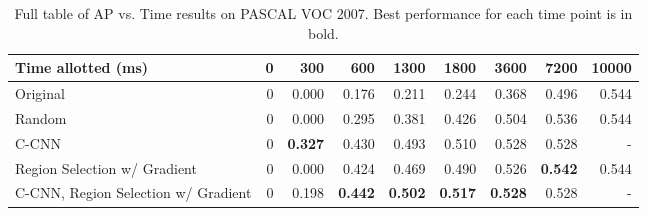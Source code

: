 \begin{table}[ht]
\centering
\caption{
Full table of AP vs. Time results on PASCAL VOC 2007.
Best performance for each time point is in bold.
}\label{tab:ccnn_results}
\small{
\begin{tabular}{lrrrrrrrr}
\toprule
Time allotted (ms)                  & 0 & 300            & 600            & 1300           & 1800           & 3600           & 7200           & 10000 \\
\midrule
Original                            & 0 & 0.000          & 0.176          & 0.211          & 0.244          & 0.368          & 0.496          & 0.544 \\
Random                              & 0 & 0.000          & 0.295          & 0.381          & 0.426          & 0.504          & 0.536          & 0.544 \\
C-CNN                               & 0 & \textbf{0.327} & 0.430          & 0.493          & 0.510          & 0.528          & 0.528          & - \\
Region Selection w/ Gradient        & 0 & 0.000          & 0.424          & 0.469          & 0.490          & 0.526          & \textbf{0.542} & 0.544 \\
C-CNN, Region Selection w/ Gradient & 0 & 0.198          & \textbf{0.442} & \textbf{0.502} & \textbf{0.517} & \textbf{0.528} & 0.528          & - \\
\bottomrule
\end{tabular}
}
\end{table}
